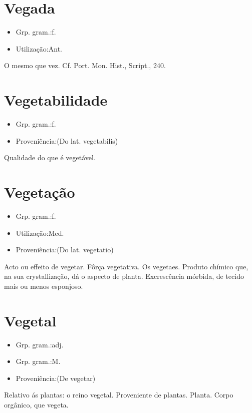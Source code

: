 \documentclass{article}
\begin{document}
\section{Vegada}
\begin{itemize}
\item {Grp. gram.:f.}
\end{itemize}
\begin{itemize}
\item {Utilização:Ant.}
\end{itemize}
O mesmo que \textunderscore vez\textunderscore . Cf. \textunderscore Port. Mon. Hist.\textunderscore , \textunderscore Script.\textunderscore , 240.
\section{Vegetabilidade}
\begin{itemize}
\item {Grp. gram.:f.}
\end{itemize}
\begin{itemize}
\item {Proveniência:(Do lat. \textunderscore vegetabilis\textunderscore )}
\end{itemize}
Qualidade do que é vegetável.
\section{Vegetação}
\begin{itemize}
\item {Grp. gram.:f.}
\end{itemize}
\begin{itemize}
\item {Utilização:Med.}
\end{itemize}
\begin{itemize}
\item {Proveniência:(Do lat. \textunderscore vegetatio\textunderscore )}
\end{itemize}
Acto ou effeito de vegetar.
Fôrça vegetativa.
Os vegetaes.
Produto chímico que, na sua crystallização, dá o aspecto de planta.
Excrescência mórbida, de tecido mais ou menos esponjoso.
\section{Vegetal}
\begin{itemize}
\item {Grp. gram.:adj.}
\end{itemize}
\begin{itemize}
\item {Grp. gram.:M.}
\end{itemize}
\begin{itemize}
\item {Proveniência:(De \textunderscore vegetar\textunderscore )}
\end{itemize}
Relativo ás plantas: \textunderscore o reino vegetal\textunderscore .
Proveniente de plantas.
Planta.
Corpo orgânico, que vegeta.
\end{document}
